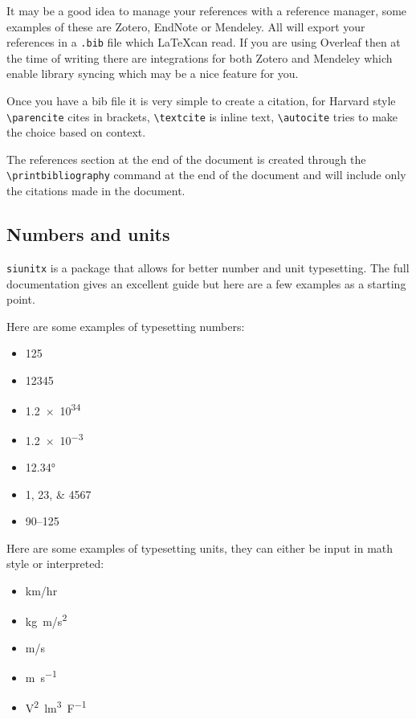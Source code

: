 It may be a good idea to manage your references with a reference manager, some examples of these are Zotero, EndNote or Mendeley. All will export your references in a \verb|.bib| file which \LaTeX can read. If you are using Overleaf then at the time of writing there are integrations for both Zotero and Mendeley which enable library syncing which may be a nice feature for you.

Once you have a bib file it is very simple to create a citation, for Harvard style \verb|\parencite| cites in brackets, \verb|\textcite| is inline text, \verb|\autocite| tries to make the choice based on context. 

The references section at the end of the document is created through the \verb|\printbibliography| command at the end of the document and will include only the citations made in the document.

\subsection{Numbers and units}
\verb|siunitx| is a package that allows for better number and unit typesetting. The full documentation gives an excellent guide \parencite{wright2024siunitx} but here are a few examples as a starting point.

Here are some examples of typesetting numbers:
\begin{itemize}
    \item \num{125}
    \item \num{12345}
    \item \num{1.2e34}
    \item \num{1.2e-3}
    \item \ang{12.34}
    \item \numlist{1;23;4567}
    \item \numrange{90}{125}
\end{itemize}

Here are some examples of typesetting units, they can either be input in math style or interpreted:
\begin{itemize}
    \item \unit{km/hr}
    \item \unit{kg.m/s^2}
    \item \unit{m/s}
    \item \unit{\metre \per \second}
    \item \unit{\square\volt\cubic\lumen\per\farad}
\end{itemize}

